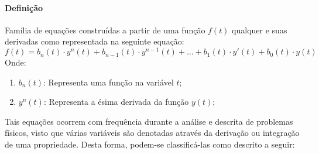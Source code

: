 \documentclass{article}
\begin{document}
        \paragraph{Definição}Família de equações construídas a partir de uma função $f(t)$ qualquer e suas derivadas como representada na seguinte equação:
            \begin{equation}
                \boxed{
                    f(t) = 
                    b_{n}(t) \cdot y^{n}(t) + 
                    b_{n-1}(t) \cdot y^{n-1}(t) + \dots + 
                    b_{1}(t) \cdot y'(t) + 
                    b_{0}(t) \cdot y(t)
                }
            \end{equation}
        Onde:
            \begin{enumerate}[noitemsep]
                \item $b_{n}(t)$: Representa uma função na variável $t$;
                \item $y^{n}(t)$: Representa a ésima derivada da função $y(t)$;
            \end{enumerate}
        Tais equações ocorrem com frequência durante a análise e descrita de problemas físicos, visto que várias variáveis são denotadas através da derivação ou integração de uma propriedade. Desta forma, podem-se classificá-las como descrito a seguir:
\end{document}
